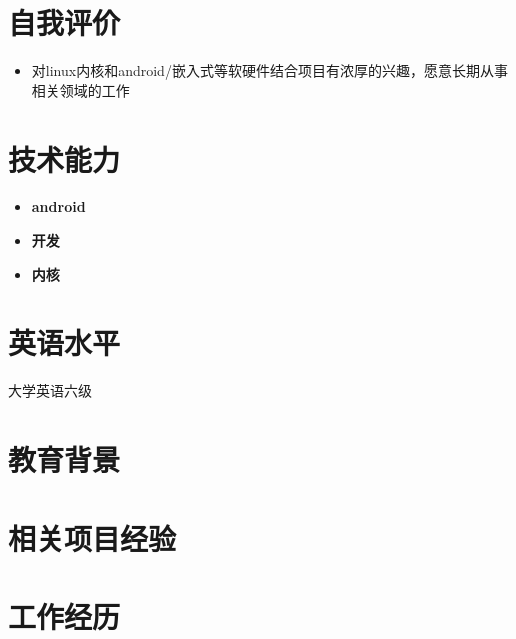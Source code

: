 \documentclass{resume}
\begin{document}



\section{自我评价}
\begin{itemize}
  
  \item 对linux内核和android/嵌入式等软硬件结合项目有浓厚的兴趣，愿意长期从事相关领域的工作
\end{itemize}

\section{技术能力}
\begin{itemize}[parsep=0.2ex]
  \item \textbf{android}
    \begin{itemize}
      
    \end{itemize}
  \item \textbf{开发}
    \begin{itemize}
      
    \end{itemize}
  \item \textbf{内核}
    \begin{itemize}
      
    \end{itemize}
\end{itemize}

\section{英语水平}
大学英语六级

\section{教育背景}

\vspace{4mm}

\section{相关项目经验}
\begin{itemize}[parsep=0.2ex]
  
\end{itemize}

\section{工作经历}

\end{document}

